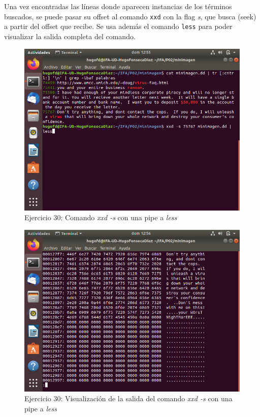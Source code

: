 \documentclass[11pt]{article}
\begin{document}
Una vez encontradas las líneas donde aparecen instancias de los términos buscados, se puede pasar su offset al comando \verb|xxd| con la flag \textit{s}, que busca (seek) a partir del offset que recibe. Se usa además el comando \verb|less| para poder visualizar la salida completa del comando.

\begin{figure}[H]
    \caption{Ejercicio 30: Comando \textit{xxd -s} con una pipe a \textit{less}}
  \centering
  \includegraphics[scale=0.7]{e30-2.png}
\end{figure}

\begin{figure}[H]
    \caption{Ejercicio 30: Visualización de la salida del comando \textit{xxd -s} con una pipe a \textit{less}}
  \centering
  \includegraphics[scale=0.7]{e30-3.png}
\end{figure}


\begin{thebibliography}{8}
\end{thebibliography}
\end{document}
